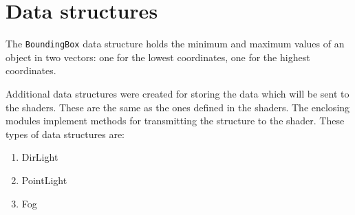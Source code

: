 \section{Data structures} 

The \verb|BoundingBox| data structure holds the minimum and maximum values of an object in two vectors: one for the lowest coordinates, one for the highest coordinates.

Additional data structures were created for storing the data which will be sent to the shaders. These are the same as the ones defined in the shaders. The enclosing modules implement methods for transmitting the structure to the shader. These types of data structures are:

\begin{enumerate}
 \item DirLight
 \item PointLight
 \item Fog
\end{enumerate}
